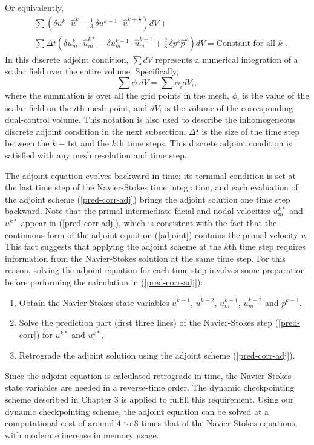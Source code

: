 Or equivalently,
\[\begin{split}
 & \sum \left( \delta u^k \cdot \hat u^k -
   \frac13\, \delta u^{k-1} \cdot \hat u^{k+\frac13} \right) dV + \\
 & \sum \Delta t \left( \delta u_m^k \cdot \hat u_m^{k*} -
                  \delta u_m^{k-1} \cdot \hat u_m^{k+1} +
                  \frac23\, \delta p^k \hat p^k \right) dV 
= \mbox{Constant for all } k \;.
\end{split} \]
In this discrete adjoint condition, $\sum dV$ represents a numerical
integration of a scalar field over the entire volume.  Specifically,
\begin{equation} \label{empty_summation}
\sum \phi\; dV = \sum \phi_i dV_i ,
\end{equation}
where the summation is over all the grid points in the mesh, $\phi_i$ is the
value of the scalar field on the $i$th mesh point, and $dV_i$ is the volume
of the corresponding dual-control volume.  This notation is also used to
describe the inhomogeneous discrete adjoint condition in the next subsection.
$\Delta t$ is the size of the time step between the $k-1$st and the
$k$th time steps.
This discrete adjoint condition is satisfied with any mesh resolution and
time step.

The adjoint equation evolves backward in time; its terminal condition is
set at the last time step of the Navier-Stokes time integration, and each
evaluation of the adjoint scheme (\ref{pred-corr-adj}) brings the adjoint
solution one time step backward.  Note that the primal intermediate facial and
nodal velocities $u_m^{k*}$ and $u^{k*}$ appear in (\ref{pred-corr-adj}), which
is consistent with the fact that the continuous form of the adjoint equation
(\ref{adjoint}) contains the primal velocity $u$.  This fact suggests that
applying the adjoint scheme at the $k$th time step requires information from the
Navier-Stokes solution at the same time step.  For this reason, solving the
adjoint equation for each time step involves some preparation before
performing the calculation in (\ref{pred-corr-adj}):
\begin{enumerate}
\item Obtain the Navier-Stokes state variables $u^{k-1}$, $u^{k-2}$,
      $u_m^{k-1}$, $u_m^{k-2}$ and $p^{k-1}$.
\item Solve the prediction part (first three lines) of the Navier-Stokes step
      (\ref{pred-corr}) for $u^{k*}$ and $u_,^{k*}$.
\item Retrograde the adjoint solution using the adjoint scheme
      (\ref{pred-corr-adj}).
\end{enumerate}
Since the adjoint equation is calculated retrograde in time, the Navier-Stokes
state variables are needed in a reverse-time order.  The dynamic checkpointing
scheme described in Chapter 3 is applied to fulfill this requirement.
Using our dynamic checkpointing scheme, the adjoint equation can be solved at
a computational cost of around 4 to 8 times that of the Navier-Stokes equations,
with moderate increase in memory usage.


